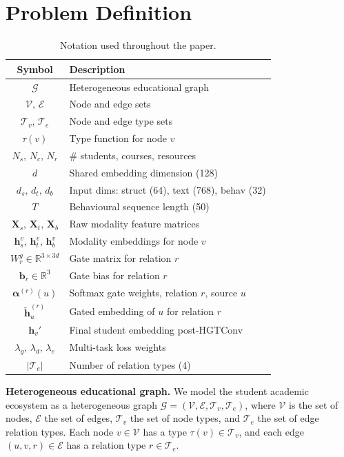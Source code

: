 \documentclass[sigconf,review]{acmart}
\begin{document}
\section{Problem Definition}
\label{sec:problem}
\begin{table}[t]
\centering
\caption{Notation used throughout the paper.}
\label{tab:notation}
\begin{tabular}{cl}
\toprule
\textbf{Symbol} & \textbf{Description} \\
\midrule
$\mathcal{G}$ & Heterogeneous educational graph \\
$\mathcal{V},\,\mathcal{E}$ & Node and edge sets \\
$\mathcal{T}_v,\,\mathcal{T}_e$ & Node and edge type sets \\
$\tau(v)$ & Type function for node $v$ \\
$N_s,\,N_c,\,N_r$ & \# students, courses, resources \\
$d$ & Shared embedding dimension (128) \\
$d_s,\,d_t,\,d_b$ & Input dims: struct (64), text (768), behav (32) \\
$T$ & Behavioural sequence length (50) \\
$\mathbf{X}_s,\,\mathbf{X}_t,\,\mathbf{X}_b$ & Raw modality feature matrices \\
$\mathbf{h}_s^v,\,\mathbf{h}_t^v,\,\mathbf{h}_b^v$ & Modality embeddings for node $v$ \\
$W_r^g \in \mathbb{R}^{3 \times 3d}$ & Gate matrix for relation $r$ \\
$\mathbf{b}_r \in \mathbb{R}^{3}$ & Gate bias for relation $r$ \\
$\boldsymbol{\alpha}^{(r)}(u)$ & Softmax gate weights, relation $r$, source $u$ \\
$\tilde{\mathbf{h}}_u^{(r)}$ & Gated embedding of $u$ for relation $r$ \\
$\mathbf{h}_v'$ & Final student embedding post-HGTConv \\
$\lambda_g,\,\lambda_d,\,\lambda_e$ & Multi-task loss weights \\
$|\mathcal{T}_e|$ & Number of relation types (4) \\
\bottomrule
\end{tabular}
\end{table}

\textbf{Heterogeneous educational graph.}
We model the student academic ecosystem as a
heterogeneous graph $\mathcal{G} = (\mathcal{V},
\mathcal{E}, \mathcal{T}_v, \mathcal{T}_e)$, where
$\mathcal{V}$ is the set of nodes, $\mathcal{E}$ the
set of edges, $\mathcal{T}_v$ the set of node types,
and $\mathcal{T}_e$ the set of edge relation types.
Each node $v \in \mathcal{V}$ has a type
$\tau(v) \in \mathcal{T}_v$, and each edge
$(u, v, r) \in \mathcal{E}$ has a relation type
$r \in \mathcal{T}_e$.
\end{document}
